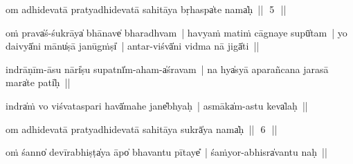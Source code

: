 \documentclass[parskip, DIV=14]{scrartcl}
\begin{document}
om adhidevatā pratyadhidevatā sahitāya bṛha॒spa̍te॒ nama̍ḥ~||~\,5\,~||
\vspace{0.5cm}


oṁ prava̍ś-śu॒krāya̍ bhā॒॒nave̍ bharadhvam~| ha॒vyaṁ ma॒tiṁ cā॒॒gnaye॒॒ supū̍tam~| yo daivyā̍ni॒ mānu̍ṣā ja॒nūgṁṣi̍~| a॒ntar-viśvā̍ni vi॒dma nā॒ jigā̍ti~||


i॒ndrā॒॒ṇīm-ā॒॒su nāri̍ṣu su॒patnī̍m-a॒ham-a̍śravam~| na hya̍syā apa॒rañca॒na ja॒rasā॒॒ mara̍te॒॒ pati̍ḥ~||


indra̍ṁ vo vi॒śvata॒spari॒ havā̍mahe॒ jane̎bhyaḥ~| a॒smāka̍m-astu॒ keva̍laḥ~||


om adhidevatā pratyadhidevatā sahitāya sukrā̍ya॒ nama̍ḥ~||~\,6\,~||
\vspace{0.5cm}

oṁ śanno̍ de॒॒vīra॒bhiṣṭa̍ya॒ āpo̍ bhavantu pī॒taye̎~| śaṁyor-a॒bhisra̍vantu naḥ~||

\end{document}
